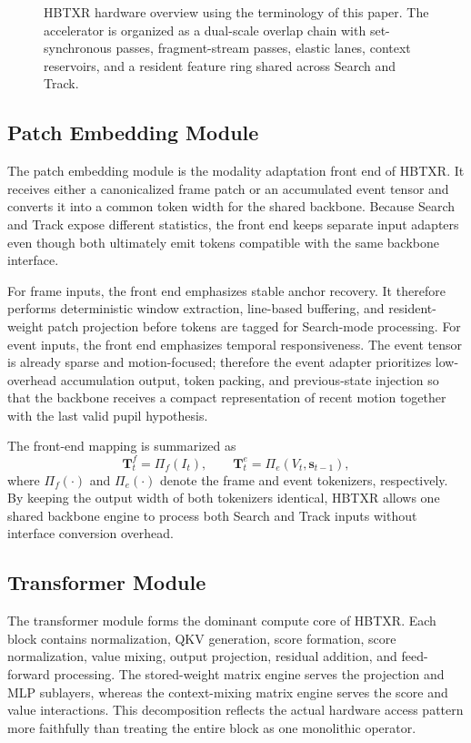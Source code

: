 \documentclass[journal]{IEEEtran}
\newcommand{\placeholderfigure}[2]{%
  \fbox{\parbox[c][#2][c]{#1}{\centering\vspace{2mm}\textbf{Figure placeholder}\\Final artwork pending\vspace{2mm}}}}
\begin{document}
\begin{figure}[t]
\centering
\placeholderfigure{0.93\textwidth}{2.15in}
\caption{HBTXR hardware overview using the terminology of this paper. The accelerator is organized as a dual-scale overlap chain with set-synchronous passes, fragment-stream passes, elastic lanes, context reservoirs, and a resident feature ring shared across Search and Track.}
\label{fig:hw_overview}
\end{figure}

\subsection{Patch Embedding Module}
The patch embedding module is the modality adaptation front end of HBTXR. It receives either a canonicalized frame patch or an accumulated event tensor and converts it into a common token width for the shared backbone. Because Search and Track expose different statistics, the front end keeps separate input adapters even though both ultimately emit tokens compatible with the same backbone interface.

For frame inputs, the front end emphasizes stable anchor recovery. It therefore performs deterministic window extraction, line-based buffering, and resident-weight patch projection before tokens are tagged for Search-mode processing. For event inputs, the front end emphasizes temporal responsiveness. The event tensor is already sparse and motion-focused; therefore the event adapter prioritizes low-overhead accumulation output, token packing, and previous-state injection so that the backbone receives a compact representation of recent motion together with the last valid pupil hypothesis.

The front-end mapping is summarized as
\begin{equation}
\mathbf{T}^{f}_{t}=\Pi_f(I_t), \qquad \mathbf{T}^{e}_{t}=\Pi_e(V_t,\mathbf{s}_{t-1}),
\end{equation}
where $\Pi_f(\cdot)$ and $\Pi_e(\cdot)$ denote the frame and event tokenizers, respectively. By keeping the output width of both tokenizers identical, HBTXR allows one shared backbone engine to process both Search and Track inputs without interface conversion overhead.

\subsection{Transformer Module}
The transformer module forms the dominant compute core of HBTXR. Each block contains normalization, QKV generation, score formation, score normalization, value mixing, output projection, residual addition, and feed-forward processing. The stored-weight matrix engine serves the projection and MLP sublayers, whereas the context-mixing matrix engine serves the score and value interactions. This decomposition reflects the actual hardware access pattern more faithfully than treating the entire block as one monolithic operator.
\end{document}
